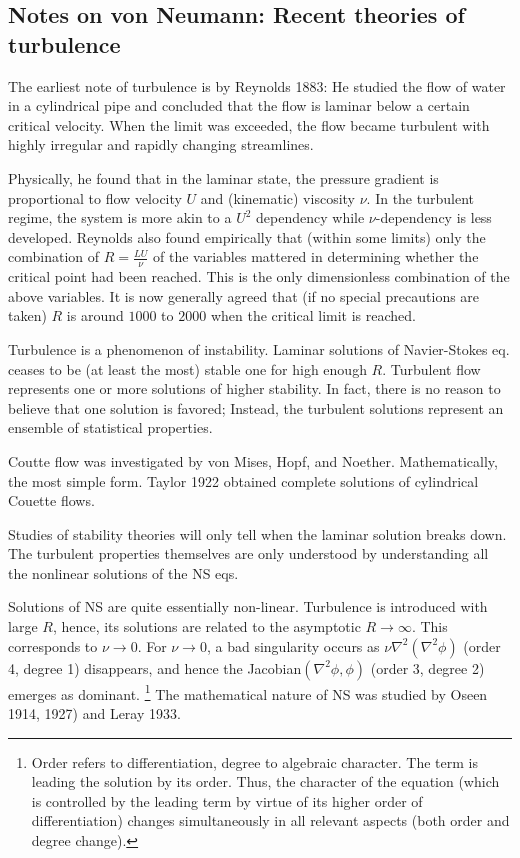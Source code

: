 \documentclass[usenatbib,twocolumn]{aastex63}
\begin{document}
\clearpage
\begin{appendix}

\section{Notes on von Neumann: Recent theories of turbulence}

The earliest note of turbulence is by Reynolds 1883:
He studied the flow of water in a cylindrical pipe and concluded that the flow is laminar below a certain critical velocity.
When the limit was exceeded, the flow became turbulent with highly irregular and rapidly changing streamlines.

Physically, he found that in the laminar state, the pressure gradient is proportional to flow velocity $U$ and (kinematic) viscosity $\nu$.
In the turbulent regime, the system is more akin to a $U^2$ dependency while $\nu$-dependency is less developed.
Reynolds also found empirically that (within some limits) only the combination of $R = \frac{L U}{\nu}$ of the variables mattered in determining whether the critical point had been reached.
This is the only dimensionless combination of the above variables.
It is now generally agreed that (if no special precautions are taken) $R$ is around $1000$ to $2000$ when the critical limit is reached.

Turbulence is a phenomenon of instability.
Laminar solutions of Navier-Stokes eq. ceases to be (at least the most) stable one for high enough $R$.
Turbulent flow represents one or more solutions of higher stability.
In fact, there is no reason to believe that one solution is favored; 
Instead, the turbulent solutions represent an ensemble of statistical properties.

Coutte flow was investigated by von Mises, Hopf, and Noether.
Mathematically, the most simple form.
Taylor 1922 obtained complete solutions of cylindrical Couette flows.

Studies of stability theories will only tell when the laminar solution breaks down.
The turbulent properties themselves are only understood by understanding all the nonlinear solutions of the NS eqs.

Solutions of NS are quite essentially non-linear.
Turbulence is introduced with large $R$, hence, its solutions are related to the asymptotic $R \rightarrow \infty$.
This corresponds to $\nu \rightarrow 0$.
For $\nu \rightarrow 0$, a bad singularity occurs as $\nu \nabla^2 (\nabla^2 \phi)$ (order 4, degree 1) disappears, and hence the Jacobian$(\nabla^2 \phi, \phi)$ (order 3, degree 2) emerges as dominant.
\footnote{
    Order refers to differentiation, degree to algebraic character.
    The term is leading the solution by its order.
    Thus, the character of the equation (which is controlled by the leading term by virtue of its higher order of differentiation) changes simultaneously in all relevant aspects (both order and degree change).
}
The mathematical nature of NS was studied by Oseen 1914, 1927) and Leray 1933.


\end{appendix}
\end{document}
